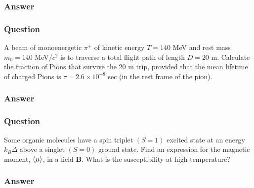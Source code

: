 \subsubsection{Answer}



\subsubsection{Question}
A beam of monoenergetic $\pi^+$ of kinetic energy $T = 140$ MeV and rest mass $m_0 = 140$ MeV/$c^2$ is to traverse a total flight path of length $D = 20$ m. Calculate the fraction of Pions that survive the 20 m trip, provided that the mean lifetime of charged Pions is $\tau= 2.6\times10^{-8}$ sec (in the rest frame of the pion).
\subsubsection{Answer}

\subsubsection{Question}
Some organic molecules have a spin triplet $(S = 1)$ excited state at an energy $k_B\Delta$ above a singlet $(S = 0)$ ground state. Find an expression for the magnetic moment, $\expval{\mu}$, in a field $\mathbf{B}$. What is the susceptibility at high temperature?
\subsubsection{Answer}



